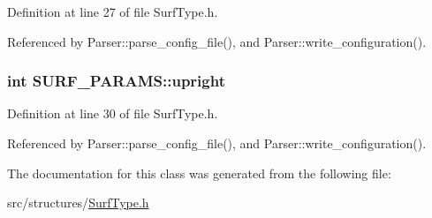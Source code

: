 \-Definition at line 27 of file \-Surf\-Type.\-h.



\-Referenced by \-Parser\-::parse\-\_\-config\-\_\-file(), and \-Parser\-::write\-\_\-configuration().

\hypertarget{class_s_u_r_f___p_a_r_a_m_s_af8ef2555b3dc9abbd8e151d60e420c7e}{
\subsubsection[{upright}]{\setlength{\rightskip}{0pt plus 5cm}int {\bf \-S\-U\-R\-F\-\_\-\-P\-A\-R\-A\-M\-S\-::upright}}}
\label{class_s_u_r_f___p_a_r_a_m_s_af8ef2555b3dc9abbd8e151d60e420c7e}


\-Definition at line 30 of file \-Surf\-Type.\-h.



\-Referenced by \-Parser\-::parse\-\_\-config\-\_\-file(), and \-Parser\-::write\-\_\-configuration().



\-The documentation for this class was generated from the following file\-:\begin{DoxyCompactItemize}
\item 
src/structures/\hyperlink{_surf_type_8h}{\-Surf\-Type.\-h}\end{DoxyCompactItemize}
